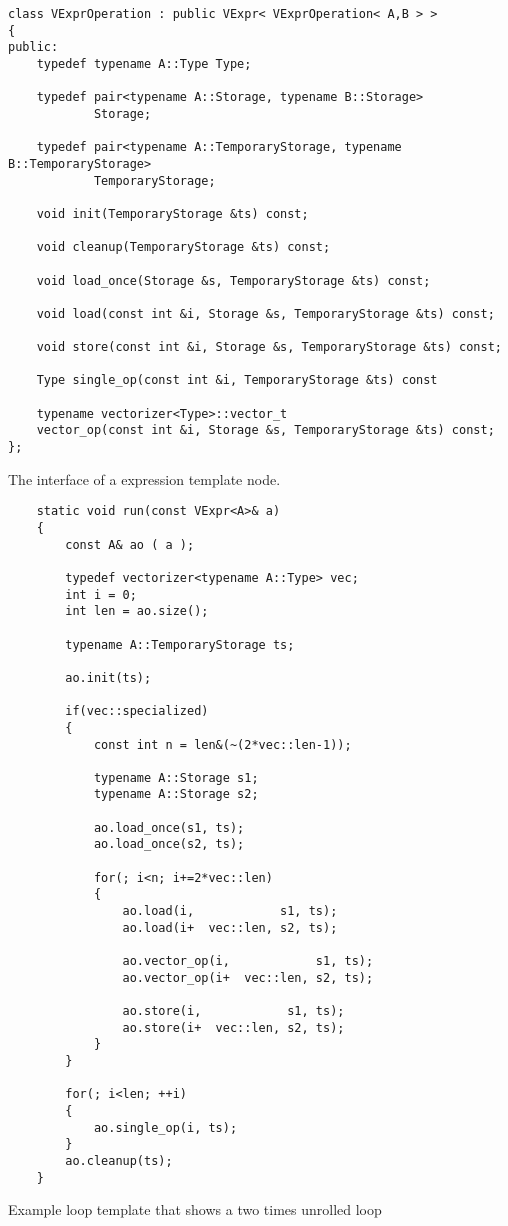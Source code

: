 \documentclass[12pt]{article}
\begin{document}
\begin{program}
{\footnotesize 
\begin{verbatim}
class VExprOperation : public VExpr< VExprOperation< A,B > >
{
public:
	typedef typename A::Type Type;
	
    typedef pair<typename A::Storage, typename B::Storage>
			Storage;
			
    typedef pair<typename A::TemporaryStorage, typename B::TemporaryStorage>
			TemporaryStorage;

    void init(TemporaryStorage &ts) const;
    
    void cleanup(TemporaryStorage &ts) const;
    
    void load_once(Storage &s, TemporaryStorage &ts) const;
    
    void load(const int &i, Storage &s, TemporaryStorage &ts) const;
    
    void store(const int &i, Storage &s, TemporaryStorage &ts) const;
    
    Type single_op(const int &i, TemporaryStorage &ts) const
    
    typename vectorizer<Type>::vector_t
    vector_op(const int &i, Storage &s, TemporaryStorage &ts) const;
};
\end{verbatim}
}
\caption{The interface of a expression template node.}
\label{protonode}
\end{program}

\begin{program}
{\footnotesize 
\begin{verbatim}
    static void run(const VExpr<A>& a)
    {
        const A& ao ( a );

        typedef vectorizer<typename A::Type> vec;
        int i = 0;
        int len = ao.size();

        typename A::TemporaryStorage ts;

        ao.init(ts);

        if(vec::specialized)
        {
            const int n = len&(~(2*vec::len-1));

            typename A::Storage s1;
            typename A::Storage s2;

            ao.load_once(s1, ts);
            ao.load_once(s2, ts);

            for(; i<n; i+=2*vec::len)
            {
                ao.load(i,            s1, ts);
                ao.load(i+  vec::len, s2, ts);

                ao.vector_op(i,            s1, ts);
                ao.vector_op(i+  vec::len, s2, ts);

                ao.store(i,            s1, ts);
                ao.store(i+  vec::len, s2, ts);
            }
        }

        for(; i<len; ++i)
        {
            ao.single_op(i, ts);
        }
        ao.cleanup(ts);
    }
\end{verbatim}
}
\caption{Example loop template that shows a two times unrolled loop}
\label{looptemplate}

\end{program}
\end{document}
